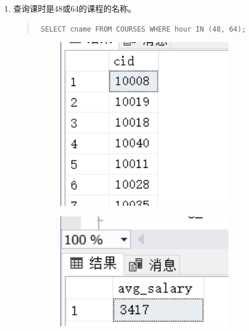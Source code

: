 \documentclass[a4paper,twoside]{article}
\begin{document}
\begin{spacing}{1.2}
\begin{enumerate}
\item 查询课时是48或64的课程的名称。
\begin{quote}
\texttt{
SELECT cname
FROM COURSES
WHERE hour IN (48, 64);
}
\end{quote}


\begin{figure}[h]
\centering
\caption{运行结果}
\begin{subfigure}{0.3\textwidth}
  \includegraphics[width=0.9\textwidth]{fig5.png}
\end{subfigure}
\begin{subfigure}{0.3\textwidth}
  \includegraphics[width=0.9\textwidth]{fig6.png}
\end{subfigure}
\end{figure}



\end{enumerate}
\end{spacing}
\end{document}
